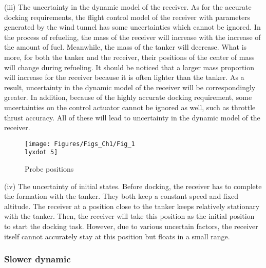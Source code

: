 (iii) The uncertainty in the dynamic model of the receiver. As for
the accurate docking requirements, the flight control model of the
receiver with parameters generated by the wind tunnel has some uncertainties
which cannot be ignored. In the process of refueling, the mass of
the receiver will increase with the increase of the amount of fuel.
Meanwhile, the mass of the tanker will decrease. What is more, for
both the tanker and the receiver, their positions of the center of
mass will change during refueling. It should be noticed that a larger
mass proportion will increase for the receiver because it is often
lighter than the tanker. As a result, uncertainty in the dynamic model
of the receiver will be correspondingly greater. In addition, because
of the highly accurate docking requirement, some uncertainties on
the control actuator cannot be ignored as well, such as throttle thrust
accuracy. All of these will lead to uncertainty in the dynamic model
of the receiver. 

\begin{figure}
\begin{centering}
\texttt{[image: Figures/Figs\_Ch1/Fig\_1\\lyxdot 5]}
\par\end{centering}
\caption{Probe positions}

\centering{}\label{Fig_1.5}
\end{figure}

(iv) The uncertainty of initial states. Before docking, the receiver
has to complete the formation with the tanker. They both keep a constant
speed and fixed altitude. The receiver at a position close to the
tanker keeps relatively stationary with the tanker. Then, the receiver
will take this position as the initial position to start the docking
task. However, due to various uncertain factors, the receiver itself
cannot accurately stay at this position but floats in a small range.

\subsubsection{Slower dynamic}

